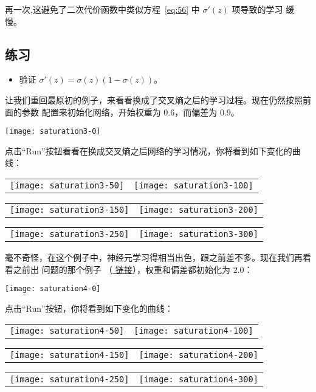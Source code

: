 再一次,这避免了二次代价函数中类似方程~\eqref{eq:56} 中 $\sigma'(z)$ 项导致的学习
缓慢。

\subsection*{练习}

\begin{itemize}
\item 验证 $\sigma'(z) = \sigma(z)(1-\sigma(z))$。
\end{itemize}

让我们重回最原初的例子，来看看换成了交叉熵之后的学习过程。现在仍然按照前面的参数
配置来初始化网络，开始权重为 $0.6$，而偏差为 $0.9$。
\begin{center}
  \texttt{[image: saturation3-0]}
\end{center}
点击“Run”按钮看看在换成交叉熵之后网络的学习情况，你将看到如下变化的曲线：
\begin{center}
  \begin{tabular}{ll}
    \texttt{[image: saturation3-50]} & \texttt{[image: saturation3-100]}\\
  \end{tabular}
  \begin{tabular}{ll}
    \texttt{[image: saturation3-150]} & \texttt{[image: saturation3-200]}\\
  \end{tabular}
  \begin{tabular}{ll}
    \texttt{[image: saturation3-250]} & \texttt{[image: saturation3-300]}
  \end{tabular}
\end{center}

毫不奇怪，在这个例子中，神经元学习得相当出色，跟之前差不多。现在我们再看看之前出
问题的那个例子
（\href{http://neuralnetworksanddeeplearning.com/chap3.html#saturation2_anchor}{
  链接}），权重和偏差都初始化为 $2.0$：
\begin{center}
  \texttt{[image: saturation4-0]}
\end{center}
点击“Run”按钮，你将看到如下变化的曲线：
\begin{center}
  \begin{tabular}{ll}
    \texttt{[image: saturation4-50]} & \texttt{[image: saturation4-100]}\\
  \end{tabular}
  \begin{tabular}{ll}
    \texttt{[image: saturation4-150]} & \texttt{[image: saturation4-200]}\\
  \end{tabular}
  \begin{tabular}{ll}
    \texttt{[image: saturation4-250]} & \texttt{[image: saturation4-300]}
  \end{tabular}
\end{center}

